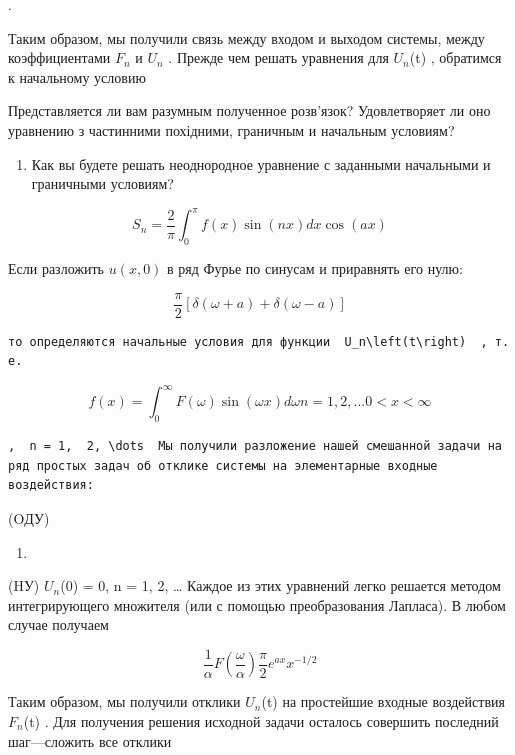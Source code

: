 \documentclass[
  ukrainian,
]{article}
\providecommand{\tightlist}{%
  \setlength{\itemsep}{0pt}\setlength{\parskip}{0pt}}
\begin{document}
.

Таким образом, мы получили связь между входом и выходом системы, между
коэффициентами \(F_n\) и \(U_n\) . Прежде чем решать уравнения для
\(U_n\)(t) , обратимся к начальному условию

Представляется ли вам разумным полученное розв'язок? Удовлетворяет ли
оно уравнению з частинними похідними, граничным и начальным условиям?

\begin{enumerate}
\def\labelenumi{\arabic{enumi}.}
\setcounter{enumi}{6}
\tightlist
\item
  Как вы будете решать неоднородное уравнение с заданными начальными и
  граничными условиям?
\end{enumerate}

\[
S_n = \frac{2}{\pi} \int_{0}^{\pi} f(x) \sin(nx) dx
\cos(ax)
\]

Если разложить \(u(x, 0)\) в ряд Фурье по синусам и приравнять его нулю:

\[
\frac{\pi}{2} [\delta(\omega+a) + \delta(\omega-a)]
\]

\begin{verbatim}
то определяются начальные условия для функции  U_n\left(t\right)  , т. е.
\end{verbatim}

\[
f(x) = \int_{0}^{\infty} F(\omega) \sin(\omega x) d\omega
n = 1, 2, ...
0 < x < \infty
\]

\begin{verbatim}
,  n = 1,  2, \dots  Мы получили разложение нашей смешанной задачи на ряд простых задач об отклике системы на элементарные входные воздействия:
\end{verbatim}

(OДУ)

\begin{enumerate}
\def\labelenumi{\arabic{enumi}.}
\tightlist
\item
\end{enumerate}

(HУ) \(U_n\)(0) = 0, n = 1, 2, \ldots{} Каждое из этих уравнений легко
решается методом интегрирующего множителя (или с помощью преобразования
Лапласа). В любом случае получаем

\[
\frac{1}{\alpha} F\left(\frac{\omega}{\alpha}\right)
\frac{\pi}{2} e^{ax}
x^{-1/2}
\]

Таким образом, мы получили отклики \(U_n\)(t) на простейшие входные
воздействия \(F_n\)(t) . Для получения решения исходной задачи осталось
совершить последний шаг---сложить все отклики
\end{document}
